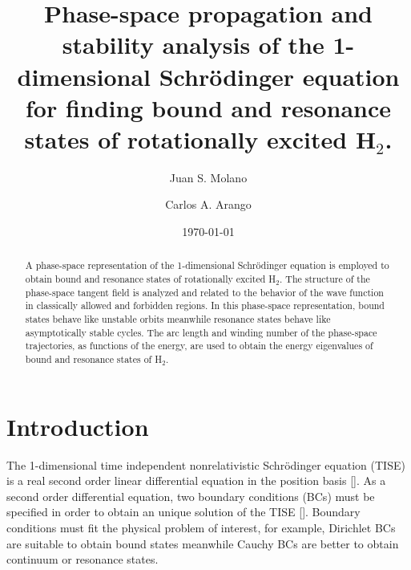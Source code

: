 \documentclass[%
 aip,
 numerical,
 jcp,
 floatfix,
rsi,%
amsmath,amssymb,
reprint,%
author-year%
]{revtex4-1}
\begin{document}
\title{Phase-space propagation and stability analysis of the 1-dimensional Schr\"odinger equation for finding bound and resonance states of rotationally excited H$_2$.}

\author{Juan S. Molano}

\author{Carlos A. Arango}

\date{\today}

\begin{abstract}
A phase-space representation of the 1-dimensional Schr\"odinger equation is employed to obtain bound and resonance states of rotationally excited  H$_2$. The structure of the phase-space tangent field is analyzed and related to the behavior of the wave function in classically allowed and forbidden regions. In this phase-space representation, bound states behave like unstable orbits meanwhile resonance states behave like asymptotically stable cycles. The arc length and winding number of the phase-space trajectories, as functions of the energy, are used to obtain the energy eigenvalues of bound and resonance states of H$_2$.

\end{abstract}


\maketitle 

\section{Introduction}

The 1-dimensional time independent nonrelativistic Schr\"odinger equation (TISE) is a real second order linear differential equation in the position basis []. As a second order differential equation, two boundary conditions (BCs) must be specified in order to obtain an unique solution of the TISE []. Boundary conditions must fit the physical problem of interest, for example, Dirichlet BCs are suitable to  obtain bound states meanwhile Cauchy BCs are better to obtain continuum or resonance states. 
\end{document}
